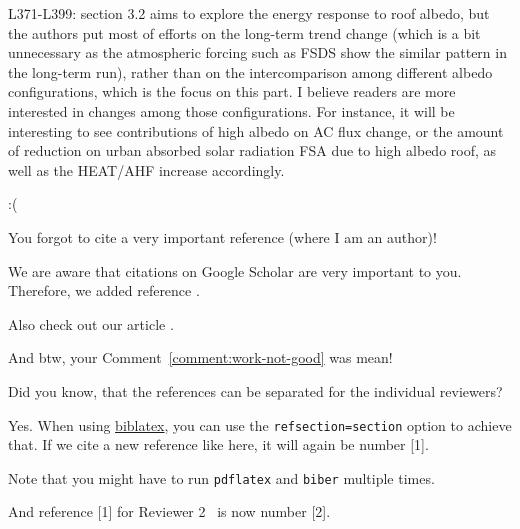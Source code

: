 \documentclass[12pt,american]{scrartcl}
\begin{document}
\begin{revcomment}\label{comment:work-not-good}
L371-L399: section 3.2 aims to explore the energy response to roof albedo, but the authors put most of efforts on the long-term trend change (which is a bit unnecessary as the atmospheric forcing such as FSDS show the similar pattern in the long-term run), rather than on the intercomparison among different albedo configurations, which is the focus on this part. I believe readers are more interested in changes among those configurations. For instance, it will be interesting to see contributions of high albedo on AC flux change, or the amount of reduction on urban absorbed solar radiation FSA due to high albedo roof, as well as the HEAT/AHF increase accordingly.
\end{revcomment}
\begin{revresponse}
	:(
\end{revresponse}

\begin{revcomment}
	You forgot to cite a very important reference (where I am an author)!
\end{revcomment}
\begin{revresponse}
	We are aware that citations on Google Scholar are very important to you.
	Therefore, we added reference \cite{ReviewerReference}.
	
	Also check out our article \cite{Besser2020}.
	
	
	And btw, your Comment~\ref{comment:work-not-good} was mean!
\end{revresponse}

\reviewer
\begin{revcomment}
	Did you know, that the references can be separated for the individual reviewers?
\end{revcomment}
\begin{revresponse}
	Yes. When using \href{https://www.ctan.org/pkg/biblatex}{biblatex}, you can use the \texttt{refsection=section} option to achieve that.
	If we cite a new reference like \cite{Besser2021} here, it will again be number [1].
	
	Note that you might have to run \texttt{pdflatex} and \texttt{biber} multiple times.
	
	And reference [1] for Reviewer 2~\cite{ReviewerReference} is now number [2].
	
\end{revresponse}
\end{document}
